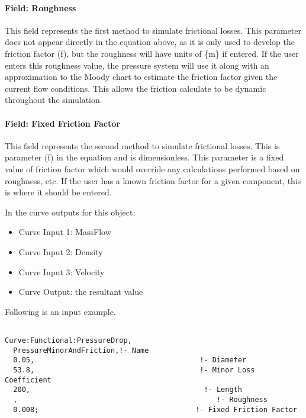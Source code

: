 \paragraph{Field: Roughness}\label{field-roughness}

This field represents the first method to simulate frictional losses. This parameter does not appear directly in the equation above, as it is only used to develop the friction factor (f), but the roughness will have units of \{m\} if entered. If the user enters this roughness value, the pressure system will use it along with an approximation to the Moody chart to estimate the friction factor given the current flow conditions. This allows the friction calculate to be dynamic throughout the simulation.

\paragraph{Field: Fixed Friction Factor}\label{field-fixed-friction-factor}

This field represents the second method to simulate frictional losses. This is parameter (f) in the equation and is dimensionless. This parameter is a fixed value of friction factor which would override any calculations performed based on roughness, etc. If the user has a known friction factor for a given component, this is where it should be entered.

In the curve outputs for this object:

\begin{itemize}
\item
  Curve Input 1: MassFlow
\item
  Curve Input 2: Density
\item
  Curve Input 3: Velocity
\item
  Curve Output: the resultant value
\end{itemize}

Following is an input example.

\begin{lstlisting}

Curve:Functional:PressureDrop,
  PressureMinorAndFriction,!- Name
  0.05,                                       !- Diameter
  53.8,                                       !- Minor Loss Coefficient
  200,                                         !- Length
  ,                                               !- Roughness
  0.008;                                     !- Fixed Friction Factor
\end{lstlisting}

